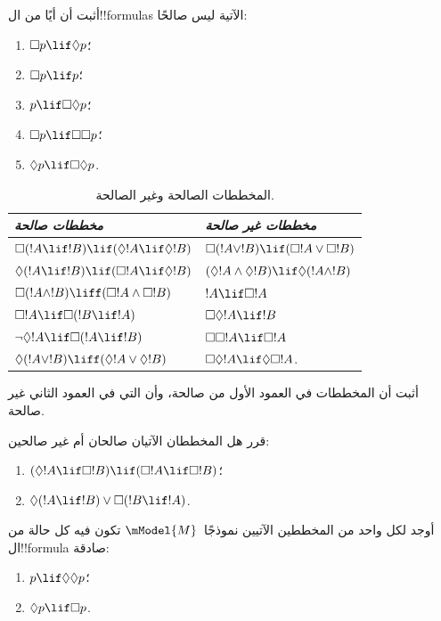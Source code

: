\documentclass[../../../include/open-logic-section]{subfiles}
\begin{document}
\begin{prob}
  أثبت أن أيًا من ال!!{formula}s الآتية ليس صالحًا:
  \begin{enumerate}
    \item[\Ax{D}:] \quad $\Box p \lif \Diamond p$؛
    \item[\Ax{T}:] \quad $\Box p \lif p$؛
    \item[\Ax{B}:] \quad $p \lif \Box\Diamond p$؛
    \item[\Ax{4}:] \quad $\Box p \lif \Box \Box p$؛
    \item[\Ax{5}:] \quad $\Diamond p \lif \Box \Diamond p$.
  \end{enumerate}
\end{prob}

\begin{table}[t]
    \centering
    \begin{tabular}{| l || l |}
      \hline
      {\emph{مخططات صالحة}} & {\emph{مخططات غير صالحة}} \\
      \hline\hline
      $\Box(!A \lif !B) \lif (\Diamond !A \lif \Diamond !B)$
      & $\Box (!A \lor !B) \lif (\Box !A \lor \Box !B)$ \\
      $\Diamond (!A \lif !B) \lif (\Box !A \lif \Diamond
      !B)$
      & $(\Diamond !A \land \Diamond !B) \lif \Diamond (!A
      \land !B)$\\
      $\Box (!A \land !B) \liff (\Box !A \land \Box !B)$
      & $!A \lif \Box !A$ \\
      $\Box !A \lif \Box (!B \lif !A)$
      & $\Box \Diamond !A \lif !B$ \\
      $\lnot \Diamond !A \lif \Box (!A \lif !B)$
      & $\Box \Box !A \lif \Box !A$ \\
      $\Diamond (!A \lor !B) \liff (\Diamond !A \lor
      \Diamond !B)$
      & $\Box \Diamond !A \lif \Diamond \Box !A$. \\
      \hline
    \end{tabular}
    \caption{المخططات الصالحة وغير الصالحة.}
\end{table}

\begin{prob}%
  أثبت أن المخططات في العمود الأول من
   صالحة، وأن التي في
  العمود الثاني غير صالحة.
\end{prob}

\begin{prob}
  قرر هل المخططان الآتيان صالحان أم غير صالحين:
  \begin{enumerate}
  \item $(\Diamond !A \lif \Box !B) \lif (\Box !A \lif \Box
    !B)$؛
  \item $\Diamond(!A \lif !B) \lor \Box(!B \lif !A)$.
  \end{enumerate}
\end{prob}

\begin{prob}
  أوجد لكل واحد من المخططين الآتيين نموذجًا~$\mModel{M}$ تكون فيه كل
  حالة من ال!!{formula} صادقة:
  \begin{enumerate}
  \item $p \lif \Diamond\Diamond p$؛
  \item $\Diamond p \lif \Box p$.
  \end{enumerate}
\end{prob}
\end{document}
